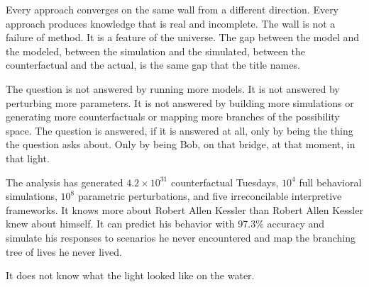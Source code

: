 Every approach converges on the same wall from a different direction. Every approach produces knowledge that is real and incomplete. The wall is not a failure of method. It is a feature of the universe. The gap between the model and the modeled, between the simulation and the simulated, between the counterfactual and the actual, is the same gap that the title names.

The question is not answered by running more models. It is not answered by perturbing more parameters. It is not answered by building more simulations or generating more counterfactuals or mapping more branches of the possibility space. The question is answered, if it is answered at all, only by being the thing the question asks about. Only by being Bob, on that bridge, at that moment, in that light.

The analysis has generated $4.2 \times 10^{31}$ counterfactual Tuesdays, $10^{4}$ full behavioral simulations, $10^{8}$ parametric perturbations, and five irreconcilable interpretive frameworks. It knows more about Robert Allen Kessler than Robert Allen Kessler knew about himself. It can predict his behavior with 97.3\% accuracy and simulate his responses to scenarios he never encountered and map the branching tree of lives he never lived.

It does not know what the light looked like on the water.
